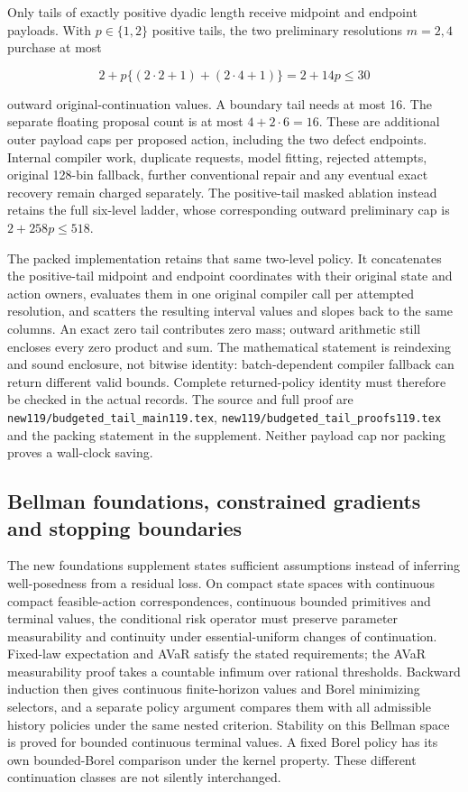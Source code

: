 Only tails of exactly positive dyadic length receive midpoint and endpoint payloads. With \(p\in\{1,2\}\) positive tails, the two preliminary resolutions \(m=2,4\) purchase at most

\[
2+p\{(2\cdot2+1)+(2\cdot4+1)\}=2+14p\le30
\]

outward original-continuation values. A boundary tail needs at most 16. The separate floating proposal count is at most \(4+2\cdot6=16\). These are additional outer payload caps per proposed action, including the two defect endpoints. Internal compiler work, duplicate requests, model fitting, rejected attempts, original 128-bin fallback, further conventional repair and any eventual exact recovery remain charged separately. The positive-tail masked ablation instead retains the full six-level ladder, whose corresponding outward preliminary cap is \(2+258p\le518\).

The packed implementation retains that same two-level policy. It concatenates the positive-tail midpoint and endpoint coordinates with their original state and action owners, evaluates them in one original compiler call per attempted resolution, and scatters the resulting interval values and slopes back to the same columns. An exact zero tail contributes zero mass; outward arithmetic still encloses every zero product and sum. The mathematical statement is reindexing and sound enclosure, not bitwise identity: batch-dependent compiler fallback can return different valid bounds. Complete returned-policy identity must therefore be checked in the actual records. The source and full proof are \nolinkurl{new119/budgeted_tail_main119.tex}, \nolinkurl{new119/budgeted_tail_proofs119.tex} and the packing statement in the supplement. Neither payload cap nor packing proves a wall-clock saving.

\hypertarget{bellman-foundations-constrained-gradients-and-stopping-boundaries}{%
\subsection{Bellman foundations, constrained gradients and stopping boundaries}\label{bellman-foundations-constrained-gradients-and-stopping-boundaries}}

The new foundations supplement states sufficient assumptions instead of inferring well-posedness from a residual loss. On compact state spaces with continuous compact feasible-action correspondences, continuous bounded primitives and terminal values, the conditional risk operator must preserve parameter measurability and continuity under essential-uniform changes of continuation. Fixed-law expectation and AVaR satisfy the stated requirements; the AVaR measurability proof takes a countable infimum over rational thresholds. Backward induction then gives continuous finite-horizon values and Borel minimizing selectors, and a separate policy argument compares them with all admissible history policies under the same nested criterion. Stability on this Bellman space is proved for bounded continuous terminal values. A fixed Borel policy has its own bounded-Borel comparison under the kernel property. These different continuation classes are not silently interchanged.

